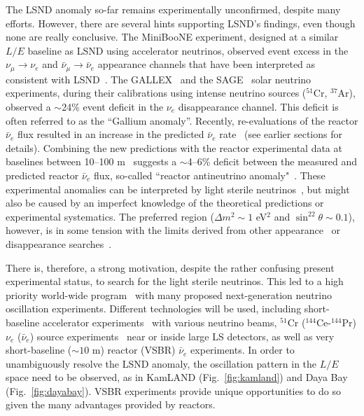 \documentclass[aps,twocolumn,preprintnumbers,amsmath,superscriptaddress,amssymb,floats,nofootinbib]{revtex4-1}
\begin{document}
The LSND anomaly so-far remains experimentally unconfirmed, despite many efforts. 
However, there are several hints supporting LSND's findings, even though none are really conclusive.
The MiniBooNE experiment, designed at a similar $L/E$ baseline as LSND using accelerator neutrinos, observed event excess 
in the $\nu_{\mu}\rightarrow\nu_e$ and $\bar\nu_{\mu}\rightarrow\bar\nu_e$ appearance channels that have been interpreted as consistent with LSND~\cite{MiniBooNE2007,MiniBooNE2013}.
The GALLEX~\cite{GALLEX2010} and the SAGE~\cite{SAGE2009} solar neutrino experiments, during their calibrations using intense neutrino sources ($^{51}$Cr, $^{37}$Ar), observed a $\sim$24\% event deficit in the $\nu_e$ disappearance channel. 
This deficit is often referred to as the ``Gallium anomaly''. 
Recently, re-evaluations of the reactor $\bar\nu_e$ flux resulted in an increase in the predicted $\bar\nu_e$ rate~\cite{Mueller, Huber} (see earlier sections for details).
Combining the new predictions with the reactor experimental data at baselines between 10--100 m~\cite{ILL,Gosgen,Rovno,Krasnoyarsk,SRP,Bugey4,Bugey3} suggests a $\sim$4--6\% deficit between the measured and predicted reactor $\bar\nu_e$ flux, so-called 
``reactor antineutrino anomaly"~\cite{Mention,Zhang13}. 
These experimental anomalies can be interpreted by light sterile neutrinos~\cite{Guinti2011}, 
but might also be caused by an imperfect knowledge of the theoretical predictions or experimental systematics.  
The preferred region ($\Delta{m}^2\sim1$ eV$^2$ and $\sin^22\theta\sim0.1$), however, is in some tension with the limits derived from other appearance~\cite{KARMEN2002,NOMAD03,OPERA13,ICARUS13} or disappearance searches~\cite{Stockdale84,Dydak84,MiniBooNE12-nubar,MiniBooNE12-nu,SuperK2000,MINOS11-NC,Bugey3,Conrad12,DayaBaySterile}.

There is, therefore, a strong motivation, despite the rather confusing present experimental status, to search for the light sterile neutrinos.
This led to a high priority world-wide program~\cite{sterileWP} with many proposed next-generation neutrino oscillation experiments.
Different technologies will be used, including short-baseline accelerator experiments~\cite{IsoDAR,OscSNS,NESSiE,LAr1-ND,nuSTORM} with various neutrino beams, 
$^{51}$Cr ($^{144}$Ce-$^{144}$Pr) $\nu_e$ ($\bar\nu_e$) source experiments~\cite{Cribier2011,Dwyer2013,SOX,CeLAND} near or inside large LS detectors, as well as very short-baseline ($\sim10$ m) reactor (VSBR) $\bar\nu_e$ experiments. 
In order to unambiguously resolve the LSND anomaly, the oscillation pattern in the $L/E$ space need to be observed, as in KamLAND (Fig.~\ref{fig:kamland}) and Daya Bay (Fig.~\ref{fig:dayabay}). 
VSBR experiments provide unique opportunities to do so given the many advantages provided by reactors.
\end{document}
